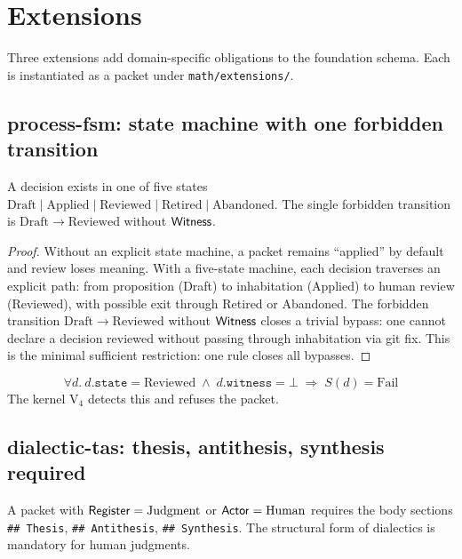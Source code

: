 
\section{Extensions}

Three extensions add domain-specific obligations to the foundation
schema. Each is instantiated as a packet under
\texttt{math/extensions/}.

\subsection{process-fsm: state machine with one forbidden transition}

\begin{theorem}
A decision exists in one of five states
$\mathrm{Draft} \mid \mathrm{Applied} \mid \mathrm{Reviewed} \mid \mathrm{Retired} \mid \mathrm{Abandoned}$.
The single forbidden transition is $\mathrm{Draft} \to \mathrm{Reviewed}$
without $\mathsf{Witness}$.
\end{theorem}

\begin{proof}
Without an explicit state machine, a packet remains ``applied'' by
default and review loses meaning. With a five-state machine, each
decision traverses an explicit path: from proposition (Draft) to
inhabitation (Applied) to human review (Reviewed), with possible
exit through Retired or Abandoned. The forbidden transition
$\mathrm{Draft} \to \mathrm{Reviewed}$ without $\mathsf{Witness}$ closes a
trivial bypass: one cannot declare a decision reviewed without
passing through inhabitation via git fix. This is the minimal
sufficient restriction: one rule closes all bypasses.
\end{proof}

\begin{theorem}
$$\forall d.\ d.\mathtt{state} = \mathrm{Reviewed} \;\wedge\; d.\mathtt{witness} = \bot \;\Rightarrow\; S(d) = \mathrm{Fail}$$
The kernel $\mathrm{V_4}$ detects this and refuses the packet.
\end{theorem}

\subsection{dialectic-tas: thesis, antithesis, synthesis required}

\begin{theorem}
A packet with $\mathsf{Register} = \mathrm{Judgment}$ or $\mathsf{Actor} = \mathrm{Human}$
requires the body sections \texttt{\#\# Thesis}, \texttt{\#\# Antithesis},
\texttt{\#\# Synthesis}. The structural form of dialectics is mandatory
for human judgments.
\end{theorem}

